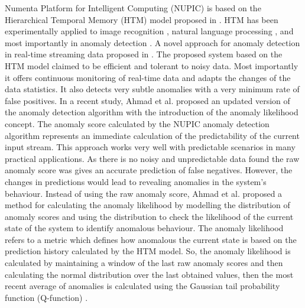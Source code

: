  Numenta Platform for Intelligent Computing (NUPIC) is based on the Hierarchical Temporal Memory (HTM) model proposed in \cite{Hawkins:2007fi}. HTM has been experimentally applied to image recognition \cite{vskoviera2013image}, natural language processing \cite{arel2010deep}, and most importantly in anomaly detection \cite{ziabaryhlmt,DBLP:journals/corr/LavinA15,DBLP:journals/corr/AhmadP16}.
A novel approach for anomaly detection  in real-time streaming data proposed in \cite{DBLP:journals/corr/AhmadP16,DBLP:journals/corr/LavinA15}. The proposed system based on the HTM model claimed to be efficient and tolerant to noisy data. Most importantly it offers continuous monitoring of real-time data and adapts the changes of the data statistics. It also detects very subtle anomalies with a very minimum rate of false positives. In a recent study, Ahmad et al. \cite{AHMAD2017134} proposed an updated version of the anomaly detection algorithm with the introduction of the anomaly likelihood concept. 
The anomaly score calculated by the NUPIC anomaly detection algorithm represents an immediate calculation of the predictability of the current input stream. This approach works very well with predictable scenarios in many practical applications. As there is no noisy and unpredictable data found the raw anomaly score was gives an accurate prediction of false negatives. However, the changes in predictions would lead to revealing anomalies in the system’s behaviour. Instead of using the raw anomaly score, Ahmad et al. \cite{AHMAD2017134} proposed a method for calculating the anomaly likelihood by modelling the distribution of anomaly scores and using the distribution to check the likelihood of the current state of the system to identify anomalous behaviour. The anomaly likelihood refers to a metric which defines how anomalous the current state is based on the prediction history calculated by the HTM model. So, the anomaly likelihood is calculated by maintaining a window of the last raw anomaly scores and then calculating the normal distribution over the last obtained values, then the most recent average of anomalies is calculated using the Gaussian tail probability function (Q-function) \cite{craig1991new}.
 
 

